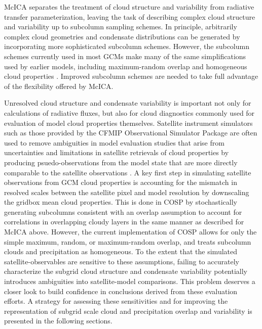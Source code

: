 \documentclass[letter]{article}
\begin{document}
McICA separates the treatment of cloud structure and variability from radiative transfer parameterization, leaving the task of describing complex cloud structure and variability up to subcolumn sampling schemes. In principle, arbitrarily complex cloud geometries and condensate distributions can be generated by incorporating more sophisticated subcolumn schemes. However, the subcolumn schemes currently used in most GCMs make many of the same simplifications used by earlier models, including maximum-random overlap and homogeneous cloud properties \citep[e.g.][]{cam4_description,cam5_description}. Improved subcolumn schemes are needed to take full advantage of the flexibility offered by McICA.

Unresolved cloud structure and condensate variability is important not only for calculations of radiative fluxes, but also for cloud diagnostics commonly used for evaluation of model cloud properties themselves. Satellite instrument simulators such as those provided by the CFMIP Observational Simulator Package \citep[COSP;][]{bodas-salcedo_et_al_2011} are often used to remove ambiguities in model evaluation studies that arise from uncertainties and limitations in satellite retrievals of cloud properties by producing psuedo-observations from the model state that are more directly comparable to the satellite observations \citep[e.g.][]{klein_and_jakob_1999,webb_et_al_2001,zhang_et_al_2005,zhang_et_al_2010,kay_et_al_2012,klein_et_al_2013}. A key first step in simulating satellite observations from GCM cloud properties is accounting for the mismatch in resolved scales between the satellite pixel and model resolution by downscaling the gridbox mean cloud properties. This is done in COSP by stochastically generating subcolumns consistent with an overlap assumption to account for correlations in overlapping cloudy layers in the same manner as described for McICA above. However, the current implementation of COSP allows for only the simple maximum, random, or maximum-random overlap, and treats subcolumn clouds and precipitation as homogeneous. To the extent that the simulated satellite-observables are sensitive to these assumptions, failing to accurately characterize the subgrid cloud structure and condensate variability potentially introduces ambiguities into satellite-model comparisons. This problem deserves a closer look to build confidence in conclusions derived from these evaluation efforts. A strategy for assessing these sensitivities and for improving the representation of subgrid scale cloud and precipitation overlap and variability is presented in the following sections.
\end{document}
